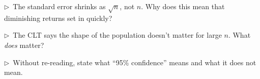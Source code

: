 \begin{reflect}
$\triangleright$~The standard error shrinks as $\sqrt{n}$, not $n$. Why does this mean that diminishing returns set in quickly?

\smallskip
$\triangleright$~The CLT says the shape of the population doesn't matter for large $n$. What \emph{does} matter?

\smallskip
$\triangleright$~Without re-reading, state what ``95\% confidence'' means and what it does not mean.
\end{reflect}
